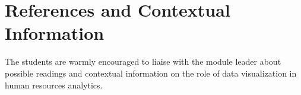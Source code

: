 \documentclass[11pt]{article}
\begin{document}
\section{References and Contextual Information}

The students are warmly encouraged to liaise with the module leader about 
possible readings and contextual information on the role of data visualization
in human resources analytics.

\printbibliography
\end{document}
